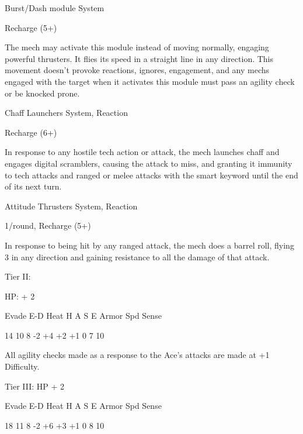 Burst/Dash module  
System
 
Recharge (5+)
 
The mech may activate this module instead of moving normally, engaging powerful thrusters. It  
flies its speed in a straight line in any direction. This movement doesn’t provoke reactions,  
ignores, engagement, and any mechs engaged with the target when it activates this module  
must pass an agility check or be knocked prone.
 

Chaff Launchers  
System, Reaction
 
Recharge (6+)
 
In response to any hostile tech action or attack, the mech launches chaff and engages digital  
scramblers, causing the attack to miss, and granting it immunity to tech attacks and ranged or  
melee attacks with the smart keyword until the end of its next turn.
 

Attitude Thrusters  
System, Reaction
 
1/round, Recharge (5+)
 
In response to being hit by any ranged attack, the mech does a barrel roll, flying 3 in any  
direction and gaining resistance to all the damage of that attack.
 

Tier II:
 
HP: + 2
 

          Evade    E-D    Heat    H     A     S    E        Armor       Spd       Sense 

          14       10     8       -2    +4    +2   +1       0            7        10 

All agility checks made as a response to the Ace’s attacks are made at +1 Difficulty.
 

Tier III:  
HP + 2
 

          Evade    E-D    Heat    H     A     S    E        Armor       Spd       Sense 

          18       11     8       -2    +6    +3   +1       0           8         10 
